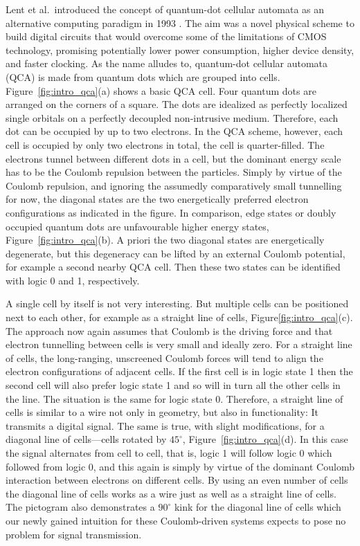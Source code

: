 Lent et al.\ introduced the concept of quantum-dot cellular automata as an
alternative computing paradigm in 1993 \cite{lent1993quantum}. The aim was a
novel physical scheme to build digital circuits that would overcome some of the
limitations of CMOS technology, promising potentially lower power consumption,
higher device density, and faster clocking. As the name alludes to, quantum-dot
cellular automata (QCA) is made from quantum dots which are grouped into cells.
Figure~\ref{fig:intro_qca}(a) shows a basic QCA cell. Four quantum dots are
arranged on the corners of a square. The dots are idealized as perfectly
localized single orbitals on a perfectly decoupled non-intrusive medium.
Therefore, each dot can be occupied by up to two electrons. In the QCA scheme,
however, each cell is occupied by only two electrons in total, the cell is
quarter-filled. The electrons tunnel between different dots in a cell, but the
dominant energy scale has to be the Coulomb repulsion between the particles.
Simply by virtue of the Coulomb repulsion, and ignoring the assumedly
comparatively small tunnelling for now, the diagonal states are the two
energetically preferred electron configurations as indicated in the figure. In
comparison, edge states or doubly occupied quantum dots are unfavourable higher
energy states, Figure~\ref{fig:intro_qca}(b). A priori the two diagonal states are
energetically degenerate, but this degeneracy can be lifted by an external
Coulomb potential, for example a second nearby QCA cell. Then these two states
can be identified with logic 0 and 1, respectively.

A single cell by itself is not very interesting. But multiple cells can be
positioned next to each other, for example as a straight line of cells,
Figure\ref{fig:intro_qca}(c). The approach now again assumes that Coulomb is the
driving force and that electron tunnelling between cells is very small and
ideally zero. For a straight line of cells, the long-ranging, unscreened Coulomb
forces will tend to align the electron configurations of adjacent cells.  If the
first cell is in logic state 1 then the second cell will also prefer logic state
1 and so will in turn all the other cells in the line. The situation is the same
for logic state 0. Therefore, a straight line of cells is similar to a wire not
only in geometry, but also in functionality: It transmits a digital signal. The
same is true, with slight modifications, for a diagonal line of cells---cells
rotated by $45^{\circ}$, Figure~\ref{fig:intro_qca}(d). In this case the signal
alternates from cell to cell, that is, logic 1 will follow logic 0 which
followed from logic 0, and this again is simply by virtue of the dominant
Coulomb interaction between electrons on different cells. By using an even
number of cells the diagonal line of cells works as a wire just as well as a
straight line of cells. The pictogram also demonstrates a $90^{\circ}$ kink for
the diagonal line of cells which our newly gained intuition for these
Coulomb-driven systems expects to pose no problem for signal transmission.

